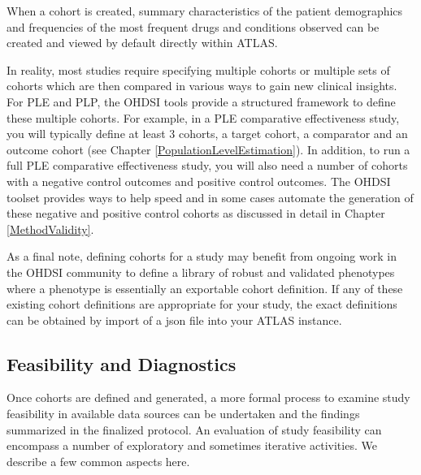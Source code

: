 \documentclass[11pt]{book}
\theoremstyle{definition}
\theoremstyle{definition}
\theoremstyle{definition}
\theoremstyle{remark}
\begin{document}
When a cohort is created, summary characteristics of the patient demographics and frequencies of the most frequent drugs and conditions observed can be created and viewed by default directly within ATLAS.

In reality, most studies require specifying multiple cohorts or multiple sets of cohorts which are then compared in various ways to gain new clinical insights.
For PLE and PLP, the OHDSI tools provide a structured framework to define these multiple cohorts. For example, in a PLE comparative effectiveness study, you will typically define at least 3 cohorts, a target cohort, a comparator and an outcome cohort (see Chapter \ref{PopulationLevelEstimation}). In addition, to run a full PLE comparative effectiveness study, you will also need a number of cohorts with a negative control outcomes and positive control outcomes. The OHDSI toolset provides ways to help speed and in some cases automate the generation of these negative and positive control cohorts as discussed in detail in Chapter \ref{MethodValidity}.

As a final note, defining cohorts for a study may benefit from ongoing work in the OHDSI community to define a library of robust and validated phenotypes where a phenotype is essentially an exportable cohort definition. If any of these existing cohort definitions are appropriate for your study, the exact definitions can be obtained by import of a json file into your ATLAS instance.

\hypertarget{Feasibility}{%
\subsection{Feasibility and Diagnostics}\label{Feasibility}}

Once cohorts are defined and generated, a more formal process to examine study feasibility in available data sources can be undertaken and the findings summarized in the finalized protocol. An evaluation of study feasibility can encompass a number of exploratory and sometimes iterative activities. We describe a few common aspects here.
\end{document}
